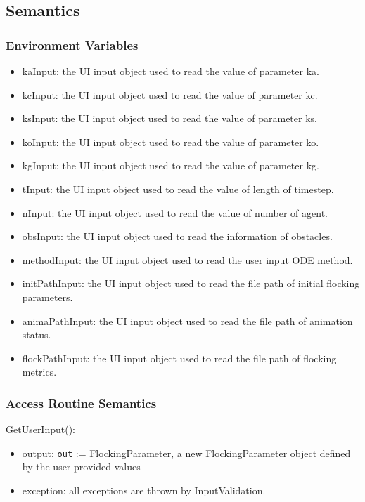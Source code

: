 \documentclass[12pt, titlepage]{article}
\begin{document}
\subsection{Semantics}

\subsubsection{Environment Variables}

\begin{itemize}
\item kaInput: the UI input object used to read the value of parameter ka.
\item kcInput: the UI input object used to read the value of parameter kc.
\item ksInput: the UI input object used to read the value of parameter ks.
\item koInput: the UI input object used to read the value of parameter ko.
\item kgInput: the UI input object used to read the value of parameter kg.
\item tInput: the UI input object used to read the value of length of timestep.
\item nInput: the UI input object used to read the value of number of agent.
\item obsInput: the UI input object used to read the information of obstacles.
\item methodInput: the UI input object used to read the user input ODE method.
\item initPathInput: the UI input object used to read the file path of initial flocking parameters.
\item animaPathInput: the UI input object used to read the file path of animation status.
\item flockPathInput: the UI input object used to read the file path of flocking metrics.
\end{itemize}

\subsubsection{Access Routine Semantics}

\noindent GetUserInput():
\begin{itemize}
\item output: \texttt{out} := FlockingParameter, a new FlockingParameter object 
defined by the user-provided values
\item exception: all exceptions are thrown by InputValidation.
\end{itemize}
\end{document}
